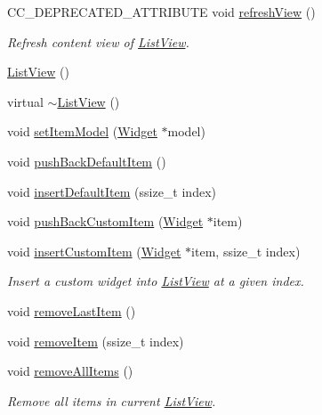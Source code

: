 \begin{DoxyCompactItemize}
C\+C\+\_\+\+D\+E\+P\+R\+E\+C\+A\+T\+E\+D\+\_\+\+A\+T\+T\+R\+I\+B\+U\+TE void \hyperlink{classui_1_1ListView_a67165072bad734eacc1cd3607471f024}{refresh\+View} ()
\begin{DoxyCompactList}\small\item\em Refresh content view of \hyperlink{classui_1_1ListView}{List\+View}. \end{DoxyCompactList}\item 
\hyperlink{classui_1_1ListView_a51ad2443dcfbd766ace32060e102f706}{List\+View} ()
\item 
virtual \hyperlink{classui_1_1ListView_aef61591c247562c7516d47a98972cadc}{$\sim$\+List\+View} ()
\item 
void \hyperlink{classui_1_1ListView_ab925e8282e44c05155b27b27d4a05808}{set\+Item\+Model} (\hyperlink{classui_1_1Widget}{Widget} $\ast$model)
\item 
void \hyperlink{classui_1_1ListView_a9ef7771758b5ffa248ac88d3bff471fe}{push\+Back\+Default\+Item} ()
\item 
void \hyperlink{classui_1_1ListView_aca5f63e916a28a84842f8a1bc4320cdb}{insert\+Default\+Item} (ssize\+\_\+t index)
\item 
void \hyperlink{classui_1_1ListView_afb0981c8954c749a31ca95d38b22de2a}{push\+Back\+Custom\+Item} (\hyperlink{classui_1_1Widget}{Widget} $\ast$item)
\item 
void \hyperlink{classui_1_1ListView_ab6e5f75b2cdf36871d994fccd55c75ae}{insert\+Custom\+Item} (\hyperlink{classui_1_1Widget}{Widget} $\ast$item, ssize\+\_\+t index)
\begin{DoxyCompactList}\small\item\em Insert a custom widget into \hyperlink{classui_1_1ListView}{List\+View} at a given index. \end{DoxyCompactList}\item 
void \hyperlink{classui_1_1ListView_ac1f87fcfe590bd09123528ef19885cdb}{remove\+Last\+Item} ()
\item 
void \hyperlink{classui_1_1ListView_a71d47608a35c7e6b7c4d986916998baa}{remove\+Item} (ssize\+\_\+t index)
\item 
\mbox{\label{classui_1_1ListView_ae4bc74035bed0c50bac28562479630c9}} 
void \hyperlink{classui_1_1ListView_ae4bc74035bed0c50bac28562479630c9}{remove\+All\+Items} ()
\begin{DoxyCompactList}\small\item\em Remove all items in current \hyperlink{classui_1_1ListView}{List\+View}. \end{DoxyCompactList}\item 

\end{DoxyCompactItemize}
